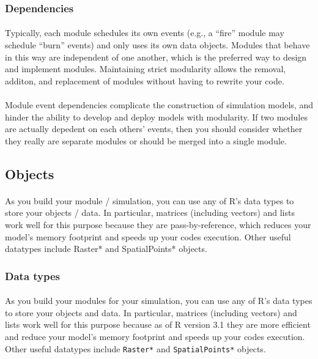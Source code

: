 \documentclass{article}
\begin{document}
\subsubsection{Dependencies}

\paragraph{}
Typically, each module schedules its own events (e.g., a ``fire'' module may schedule ``burn'' events) and only uses its own data objects. Modules that behave in this way are independent of one another, which is the preferred way to design and implement modules. Maintaining strict modularity allows the removal, additon, and replacement of modules without having to rewrite your code.

\paragraph{}
Module event dependencies complicate the construction of simulation models, and hinder the ability to develop and deploy models with modularity. If two modules are actually depedent on each others' events, then you should consider whether they really are separate modules or should be merged into a single module.

\subsection{Objects}

\paragraph{}
As you build your module / simulation, you can use any of \textsf{R}'s data types to store your objects / data. In particular, matrices (including vectors) and lists work well for this purpose because they are pass-by-reference, which reduces your model's memory footprint and speeds up your codes execution. Other useful datatypes include Raster* and SpatialPoints* objects.

\subsubsection{Data types}

\paragraph{}
As you build your modules for your simulation, you can use any of \textsf{R}'s data types to store your objects and data. In particular, matrices (including vectors) and lists work well for this purpose because as of \textsf{R} version 3.1 they are more efficient and reduce your model's memory footprint and speeds up your codes execution. Other useful datatypes include \texttt{Raster*} and \texttt{SpatialPoints*} objects.
\end{document}

